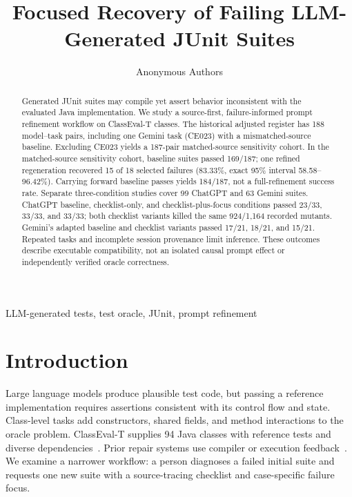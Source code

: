 \documentclass[conference]{IEEEtran}
\begin{document}
\title{Focused Recovery of Failing LLM-Generated JUnit Suites}
\author{Anonymous Authors}
\maketitle

\begin{abstract}
Generated JUnit suites may compile yet assert behavior inconsistent with the evaluated Java implementation. We study a source-first, failure-informed prompt refinement workflow on ClassEval-T classes. The historical adjusted register has 188 model--task pairs, including one Gemini task (CE023) with a mismatched-source baseline. Excluding CE023 yields a 187-pair matched-source sensitivity cohort. In the matched-source sensitivity cohort, baseline suites passed 169/187; one refined regeneration recovered 15 of 18 selected failures (83.33\%, exact 95\% interval 58.58--96.42\%). Carrying forward baseline passes yields 184/187, not a full-refinement success rate. Separate three-condition studies cover 99 ChatGPT and 63 Gemini suites. ChatGPT baseline, checklist-only, and checklist-plus-focus conditions passed 23/33, 33/33, and 33/33; both checklist variants killed the same 924/1,164 recorded mutants. Gemini's adapted baseline and checklist variants passed 17/21, 18/21, and 15/21. Repeated tasks and incomplete session provenance limit inference. These outcomes describe executable compatibility, not an isolated causal prompt effect or independently verified oracle correctness.
\end{abstract}
\begin{IEEEkeywords}
LLM-generated tests, test oracle, JUnit, prompt refinement
\end{IEEEkeywords}

\section{Introduction}
Large language models produce plausible test code, but passing a reference implementation requires assertions consistent with its control flow and state. Class-level tasks add constructors, shared fields, and method interactions to the oracle problem. ClassEval-T supplies 94 Java classes with reference tests and diverse dependencies~\cite{classevalt}. Prior repair systems use compiler or execution feedback~\cite{chattester,testart}. We examine a narrower workflow: a person diagnoses a failed initial suite and requests one new suite with a source-tracing checklist and case-specific failure focus.
\end{document}
